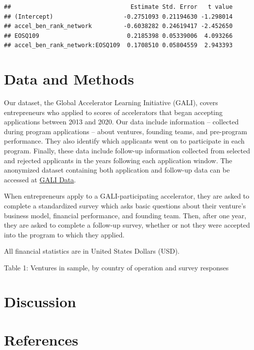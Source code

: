 \documentclass[
  english,
  man]{apa6}
\begin{document}
\begin{verbatim}
##                                  Estimate Std. Error   t value
## (Intercept)                    -0.2751093 0.21194630 -1.298014
## accel_ben_rank_network         -0.6038282 0.24619417 -2.452650
## EOSQ109                         0.2185398 0.05339006  4.093266
## accel_ben_rank_network:EOSQ109  0.1708510 0.05804559  2.943393
\end{verbatim}

\hypertarget{data-and-methods}{%
\section{Data and Methods}\label{data-and-methods}}

Our dataset, the Global Accelerator Learning Initiative (GALI), covers entrepreneurs who applied to scores of accelerators that began accepting applications between 2013 and 2020. Our data include information -- collected during program applications -- about ventures, founding teams, and pre-program performance. They also identify which applicants went on to participate in each program. Finally, these data include follow-up information collected from selected and rejected applicants in the years following each application window. The anonymized dataset containing both application and follow-up data can be accessed at \href{www.galidata.org/data-request}{GALI Data}.

When entrepreneurs apply to a GALI-participating accelerator, they are asked to complete a standardized survey which asks basic questions about their venture's business model, financial performance, and founding team. Then, after one year, they are asked to complete a follow-up survey, whether or not they were accepted into the program to which they applied.

All financial statistics are in United States Dollars (USD).

Table 1: Ventures in sample, by country of operation and survey responses

\hypertarget{discussion}{%
\section{Discussion}\label{discussion}}

\newpage

\hypertarget{references}{%
\section{References}\label{references}}
\end{document}
